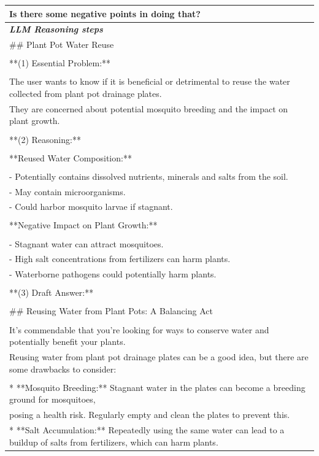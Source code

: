 \begin{table}[ht]
\begin{tabular}{p{13cm}}
Is there some negative points in doing that? \\
\midrule
\textit{\textbf{LLM Reasoning steps}} \\
\midrule
\#\# Plant Pot Water Reuse \\
\\
**(1) Essential Problem:** \\
\\
The user wants to know if it is beneficial or detrimental to reuse the water collected from plant pot drainage plates. \\
They are concerned about potential mosquito breeding and the impact on plant growth. \\
\\
**(2) Reasoning:** \\
\\
**Reused Water Composition:**\\
\\
- Potentially contains dissolved nutrients, minerals and salts from the soil. \\
- May contain microorganisms. \\
- Could harbor mosquito larvae if stagnant. \\
\\
**Negative Impact on Plant Growth:** \\
\\
- Stagnant water can attract mosquitoes. \\
- High salt concentrations from fertilizers can harm plants. \\
- Waterborne pathogens could potentially harm plants. \\
\\
**(3) Draft Answer:** \\
\\
\#\# Reusing Water from Plant Pots: A Balancing Act \\
\\
It's commendable that you're looking for ways to conserve water and potentially benefit your plants. \\
Reusing water from plant pot drainage plates can be a good idea, but there are some drawbacks to consider: \\
\\
* **Mosquito Breeding:** Stagnant water in the plates can become a breeding ground for mosquitoes, \\
posing a health risk. Regularly empty and clean the plates to prevent this. \\
* **Salt Accumulation:** Repeatedly using the same water can lead to a buildup of salts from fertilizers, which can harm plants. \\

\end{tabular}
\end{table}
